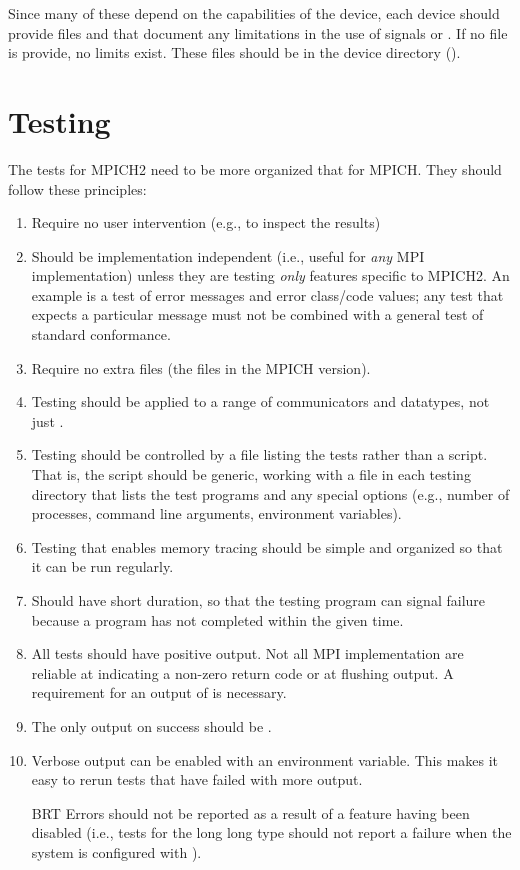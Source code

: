 \documentclass{article}
\begin{document}
Since many of these depend on the capabilities of the device, each device
should provide files  and  that
document any limitations in the use of signals or .  If
no file is provide, no limits exist.  These files should be in the device
directory ().

\section{Testing}
\label{sec:testing}

The tests for MPICH2 need to be more organized that for MPICH. They
should follow these principles:
\begin{enumerate}
\item Require no user intervention (e.g., to inspect the results)
\item Should be implementation independent (i.e., useful for
\emph{any} MPI implementation) unless they are testing \emph{only}
features specific to MPICH2.  An example is a test of error messages
and error class/code values; any test that expects a particular
message must not be combined with a general test of standard
conformance.
\item Require no extra files (the  files in the MPICH
version).
\item Testing should be applied to a range of communicators and
datatypes, not just .  
\item Testing should be controlled by a file listing the tests rather
than a script.  That is, the script  should be generic,
working with a file in each testing directory that lists the test
programs and any special options (e.g., number of processes, command
line arguments, environment variables).
\item Testing that enables memory tracing should be simple and
organized so that it can be run regularly.
\item Should have short duration, so that the testing program can
signal failure because a program has not completed within the given
time.
\item All tests should have positive output.  Not all MPI
implementation are reliable at indicating a non-zero return code or at
flushing output.  A requirement for an output of  is
necessary. 
\item The only output on success should be .
\item Verbose output can be enabled with an environment variable.  This makes
  it easy to rerun tests that have failed with more output.
\item [BRT] Errors should not be reported as a result of a feature
having been disabled (i.e., tests for the long long type should not
report a failure when the system is configured with
).
\end{enumerate}
\end{document}
